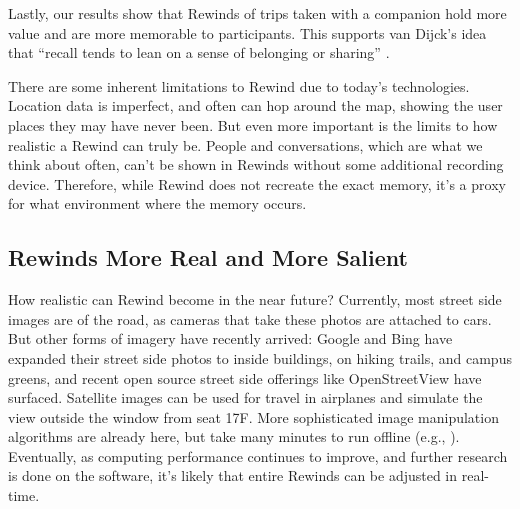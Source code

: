\documentclass{sigchi}
\begin{document}
Lastly, our results show that Rewinds of trips taken with a companion hold more value and are more memorable to participants. This supports van Dijck's idea that ``recall tends to lean on a sense of belonging or sharing'' \cite{van2007mediated}.

		

There are some inherent limitations to Rewind due to today's technologies. Location data is imperfect, and often can hop around the map, showing the user places they may have never been. But even more important is the limits to how realistic a Rewind can truly be. People and conversations, which are what we think about often, can't be shown in Rewinds without some additional recording device. Therefore, while Rewind does not recreate the exact memory, it's a proxy for what environment where the memory occurs.

\subsection{Rewinds More Real and More Salient}

How realistic can Rewind become in the near future? Currently, most street side images are of the road, as cameras that take these photos are attached to cars. But other forms of imagery have recently arrived: Google and Bing have expanded their street side photos to inside buildings, on hiking trails, and campus greens, and recent open source street side offerings like OpenStreetView have surfaced. Satellite images can be used for travel in airplanes and simulate the view outside the window from seat 17F. More sophisticated image manipulation algorithms are already here, but take many minutes to run offline (e.g., \cite{laffont2014transient,shih2013data}). Eventually, as computing performance continues to improve, and further research is done on the software, it's likely that entire Rewinds can be adjusted in real-time.
\end{document}
